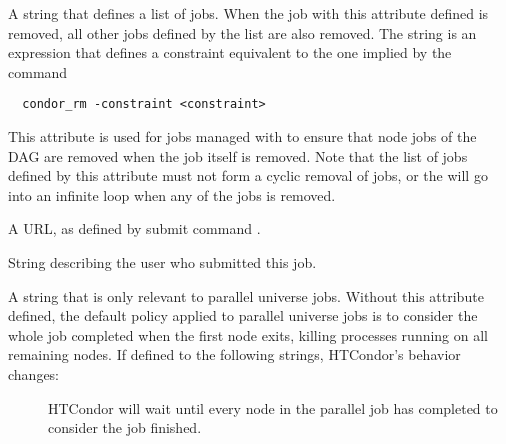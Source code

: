 \begin{description}
\label{attribute-OtherJobRemoveRequirements}
\item[\AdAttr{OtherJobRemoveRequirements}:]
A string that defines a list of jobs.
When the job with this attribute defined is removed,
all other jobs defined by the list are also removed.
The string is an expression that defines a constraint equivalent to
the one implied by the command 
\begin{verbatim}
  condor_rm -constraint <constraint>
\end{verbatim}
This attribute is used for jobs managed with  to ensure
that node jobs of the DAG are removed when the  job
itself is removed.  Note that the list of jobs defined by this attribute
must not form a cyclic removal of jobs,
or the  will go into an infinite loop 
when any of the jobs is removed.

\item[\AdAttr{OutputDestination}:]  A URL, as defined by submit command
.

\item[\AdAttr{Owner}:]  String describing the user who submitted this
job.

\item[\AdAttr{ParallelShutdownPolicy}:]  A string that is only relevant
to parallel universe jobs.  Without this attribute defined, the default
policy applied to parallel universe jobs is to consider the whole job
completed when the first node exits, killing processes running on
all remaining nodes.  If defined to the following strings, HTCondor's
behavior changes:
  \begin{description}
  \item[] HTCondor will wait until every node in 
  the parallel job has completed to consider the job finished.
  \end{description}



\end{description}
